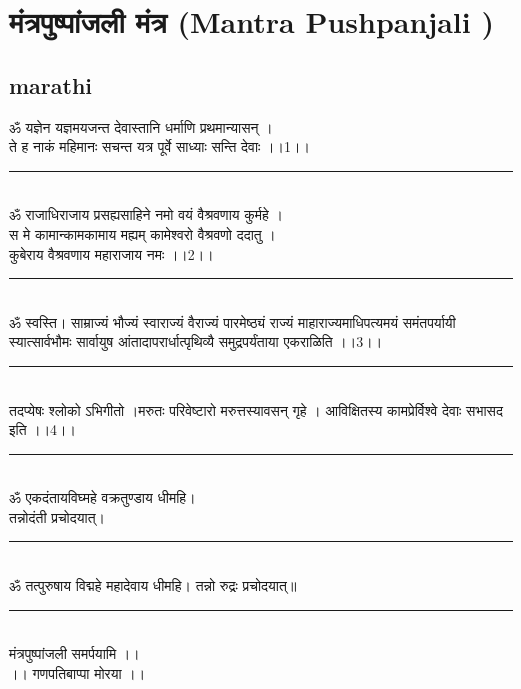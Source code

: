 \documentclass[letterpaper,twocolumn,openany,nodeprecatedcode]{dndbook}
\begin{document}
\chapter{मंत्रपुष्पांजली मंत्र (Mantra Pushpanjali )}
\begin{flushleft}
  \section*{marathi}
  ॐ यज्ञेन यज्ञमयजन्त देवास्तानि धर्माणि प्रथमान्यासन् ।\\ ते ह नाकं महिमानः सचन्त यत्र पूर्वे साध्याः सन्ति देवाः ।।1।।\\
  \rule{\linewidth}{1pt} \\
  ॐ राजाधिराजाय प्रसह्यसाहिने नमो वयं वैश्रवणाय कुर्महे ।\\ स मे कामान्कामकामाय मह्यम् कामेश्वरो वैश्रवणो ददातु ।\\ कुबेराय वैश्रवणाय महाराजाय नमः ।।2।।\\
  \rule{\linewidth}{1pt} \\
  ॐ स्वस्ति। साम्राज्यं भौज्यं स्वाराज्यं वैराज्यं पारमेष्ठ्यं राज्यं माहाराज्यमाधिपत्यमयं समंतपर्यायी स्यात्सार्वभौमः सार्वायुष आंतादापरार्धात्पृथिव्यै समुद्रपर्यंताया एकराळिति ।।3।।\\
  \rule{\linewidth}{1pt} \\
  तदप्येषः श्लोको ऽभिगीतो ।मरुतः परिवेष्टारो मरुत्तस्यावसन् गृहे । आविक्षितस्य कामप्रेर्विश्वे देवाः सभासद इति ।।4।।\\
  \rule{\linewidth}{1pt} \\
  ॐ एकदंतायविघ्महे वक्रतुण्डाय धीमहि।\\
  तन्नोदंती प्रचोदयात्।\\
  \rule{\linewidth}{1pt} \\
  ॐ तत्पुरुषाय विद्महे महादेवाय धीमहि।
  तन्नो रुद्रः प्रचोदयात्॥ \\
  \rule{\linewidth}{1pt} \\
  मंत्रपुष्पांजली समर्पयामि ।।\\

  ।। गणपतिबाप्पा मोरया ।।\\
  \pagebreak

\end{flushleft}
\end{document}
